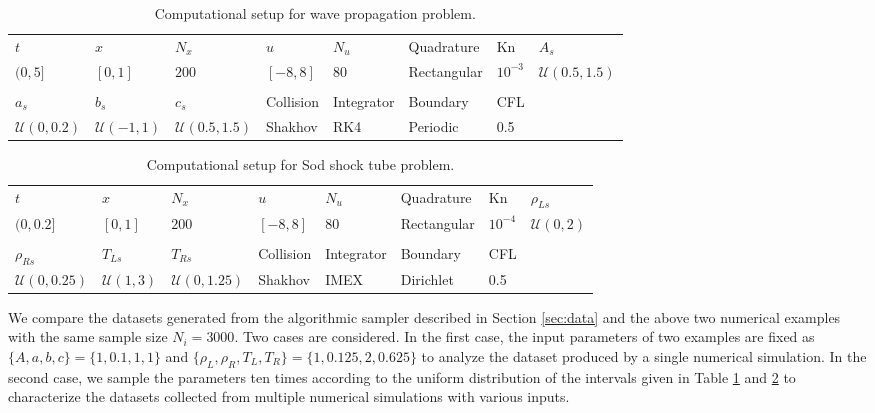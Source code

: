 \documentclass[preprint,3p,12pt,sort&compress]{elsarticle}
\begin{document}
\begin{table}[htbp]
	\caption{Computational setup for wave propagation problem.} 
	\centering
	\begin{tabular}{llllllll} 
		\hline
		$t$ & $x$ & $N_x$ & $u$ & $N_u$ & Quadrature & Kn & $A_s$ \\ 
		$(0,5]$ & $[0,1]$ & $200$ & $[-8,8]$ & 80 & Rectangular & $10^{-3}$ & $\mathcal U(0.5,1.5)$ \\ 
		\rule{0pt}{0ex}\\
		$a_s$ & $b_s$ & $c_s$ & Collision & Integrator & Boundary & CFL \\ 
		$\mathcal U(0,0.2)$ & $\mathcal U(-1,1)$ & $\mathcal U(0.5,1.5)$ & Shakhov & RK4 & Periodic & 0.5 \\ 
		\hline
	\end{tabular} 
	\label{tab:wave}
\end{table}

\begin{table}[htbp]
	\caption{Computational setup for Sod shock tube problem.} 
	\centering
	\begin{tabular}{llllllll} 
		\hline
		$t$ & $x$ & $N_x$ & $u$ & $N_u$ & Quadrature & Kn & $\rho_{Ls}$ \\
		$(0,0.2]$ & $[0,1]$ & $200$ & $[-8,8]$ & 80 & Rectangular & $10^{-4}$ & $\mathcal U(0,2)$ \\
		\rule{0pt}{0ex}\\
		$\rho_{Rs}$ & $T_{Ls}$ & $T_{Rs}$ & Collision & Integrator & Boundary & CFL \\ 
		$\mathcal U(0,0.25)$ & $\mathcal U(1,3)$ & $\mathcal U(0,1.25)$ & Shakhov & IMEX & Dirichlet & 0.5 \\
		\hline
	\end{tabular} 
	\label{tab:sod}
\end{table}

We compare the datasets generated from the algorithmic sampler described in Section \ref{sec:data} and the above two numerical examples with the same sample size $N_i=3000$.
Two cases are considered.
In the first case, the input parameters of two examples are fixed as $\{A,a,b,c\}=\{1,0.1,1,1\}$ and $\{\rho_L,\rho_R,T_L,T_R\}=\{1,0.125,2,0.625\}$ to analyze the dataset produced by a single numerical simulation.
In the second case, we sample the parameters ten times according to the uniform distribution of the intervals given in Table \ref{tab:wave} and \ref{tab:sod} to characterize the datasets collected from multiple numerical simulations with various inputs.
\end{document}
